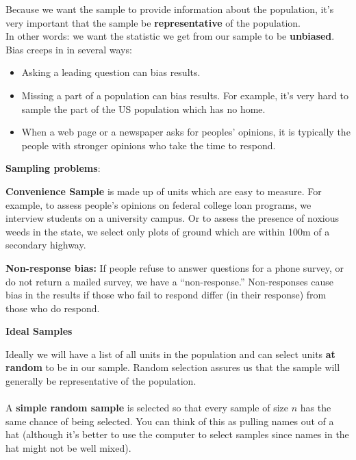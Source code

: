 Because we want the sample to provide information about the
population, it's very important that the sample be {\bf
  representative} of the population. \\
In other words: we want the statistic we get from our sample to be
{\bf unbiased}.  Bias creeps in in several ways:
\begin{itemize}
  \item Asking a leading question can bias results.  
  \item Missing a part of a population can bias results.  For example,
    it's very hard to sample the part of the US population which has
    no home.
  \item When a web page or a newspaper asks for peoples' opinions, it
    is typically the people with stronger opinions who take the time
    to respond. 
\end{itemize}

\begin{center}
  {\bf Sampling problems}:\vspace{-.5cm}
\end{center}
\begin{list}{}{}
\item [\bf Convenience Sample]  is made up of units which are easy to
  measure. For example, to assess people's opinions on federal college
  loan programs, we interview students on a university campus.  Or to
  assess the presence of noxious weeds in the state, we select only plots
  of ground which are within 100m of a secondary highway. 
\item [\bf Non-response bias:] If people refuse to answer questions
  for a phone survey, or do not return a mailed survey, we have a
  ``non-response.'' Non-responses cause bias in the results if those
  who fail to respond differ (in their response) from those who do
  respond. 
\end{list}

\begin{center}
  {\bf Ideal Samples}
\end{center}
 Ideally we will have a list of all units in the population and can
 select units {\bf at random} to be in our sample. 
Random selection assures us that the sample will generally be
representative of the population.\\ \\
 A {\bf simple random sample} is selected so that every sample of size
 $n$ has the same chance of being selected.  You can think of this as
 pulling names out of a hat (although it's better to use the computer
 to select samples since names in the hat might not be well mixed). 

